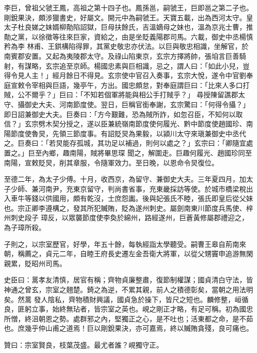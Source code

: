 \begin{pinyinscope}
 李巨，曾祖父虢王鳳，高祖之第十四子也。鳳孫邕，嗣虢王，巨即邕之第二子也。剛銳果決，頗涉獵書史，好屬文。開元中為嗣虢王。天寶五載，出為西河太守。皇太子杜良娣之妹婿柳勣陷詔獄，巨母扶餘氏，吉溫嫡母之妹也，溫為京兆士曹，推勣之黨，以徐徵等往來巨家，資給之，由是坐貶義陽郡司馬。六載，御史中丞楊慎矜為李
 林甫、王鉷構陷得罪，其黨史敬忠亦伏法。以巨與敬忠相識，坐解官，於南賓郡安置。又起為夷陵郡太守。及祿山陷東京，玄宗方擇將帥，張垍言巨善騎射，有謀略，玄宗追至京師。楊國忠素與巨相識，忌之，謂人曰：「如此小兒，豈得令見人主！」經月餘日不得見。玄宗使中官召入奏事，玄宗大悅，遂令中官劉奉庭宣敕令宰相與巨語，幾亭午，方出。國忠頗怠，對奉庭謂巨曰：「比來人多口打賊，公不爾乎？」巨曰：「不知若個軍將能與相公手打賊乎？」
 尋授陳留譙郡太守、攝御史大夫、河南節度使。翌日，巨稱官銜奉謝，玄宗驚曰：「何得令攝？」即日詔兼御史大夫。巨奏曰：「方今艱難，恐為賊所詐，如忽召臣，不知何以取信？」玄宗劈木契分授之，遂以臣兼統嶺南節度使何履光、黔中節度使趙國珍、南陽節度使魯炅，先領三節度事。有詔貶炅為果毅，以潁川太守來瑱兼御史中丞代之。巨奏曰：「若炅能存孤城，其功足以補過，則何以處之？」玄宗曰：「卿隨宜處置之。」巨至內鄉，趣南陽，賊將畢思琛
 聞之，解圍走。巨趣何履光、趙國珍同至南陽，宣敕貶炅，削其章服，令隨軍效力。至日晚，以恩命令炅復位。



 至德二年，為太子少傅。十月，收西京，為留守、兼御史大夫。三年夏四月，加太子少師、兼河南尹，充東京留守，判尚書省事，充東畿採訪等使。於城市橋梁稅出入車牛等錢以供國用，頗有乾沒，士庶怨讟。後與妃張氏不睦，張氏即皇后從父妹也。宗正卿李遵構之，發其所犯贓賄，貶為遂州刺史。屬劍南東川節度兵馬使、梓州刺史段子
 璋反，以眾襲節度使李奐於綿州，路經遂州，巨蒼黃修屬郡禮迎之，為子璋所殺。



 子則之，以宗室歷官，好學，年五十餘，每執經詣太學聽受。嗣曹王皋自荊南來朝，稱薦之，貞元二年，自睦王府長史遷左金吾衛大將軍，以從父甥竇申追游無閑親累，貶昭州司馬。



 史臣曰：暠孝友清慎，居官有稱；齊物貞廉整肅，復節制權謀；國貞清白守法，皆神通之曾玄，宗室之翹楚。錡之為逆，不累其親，前人之積德彰矣，當朝之用法明矣。然暠
 發人陰私，齊物積財興議，國貞急於操下，皆尺之短也。麟修整，峘循良，匪躬立事，始終無玷者，皆宗室之英也。峴之剛正才略，有足可稱。初為國忠所憎，終沮朝恩之勢。處群邪之內，堅獨正之心，是不吐也；活東都之命，是不茹也。庶幾乎仲山甫之道焉！巨以剛銳果決，亦可嘉焉，終以贓賄貪殘，良可痛也。



 贊曰：宗室賢良，枝葉茂盛。最尤者誰？峴獨守正。



\end{pinyinscope}